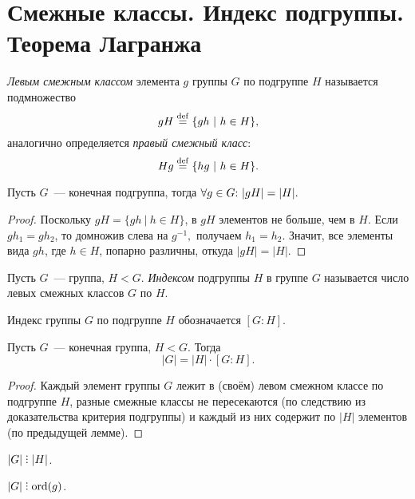\newpage
	\section{Смежные классы. Индекс подгруппы. Теорема Лагранжа}
	\setcounter{definition}{0}
	\begin{definition}
		\textit{Левым смежным классом} элемента $g$ группы $G$ по подгруппе $H$ называется подмножество
		\begin{equation*}
			gH \deq \{gh \ | \ h \in H\},
		\end{equation*}
		аналогично определяется \textit{правый смежный класс}:
		\begin{equation*}
			Hg \stackrel{\mathrm{def}}{=} \{hg \ | \ h \in H\}.
		\end{equation*}
	\end{definition}
	\begin{lemma}
		Пусть $G$~--- конечная подгруппа, тогда $\forall g \in G{:}{ } \  |gH| = |H|.$
	\end{lemma}
	\begin{proof}
		Поскольку ${gH = \{gh \ | \ h \in H\}}$, в $gH$ элементов не больше, чем в $H$. Если ${gh_1 = gh_2}$, то домножив слева на $g^{-1},$ получаем ${h_1 = h_2}$. Значит, все элементы вида $gh$, где ${h \in H}$, попарно различны, откуда ${|gH| = |H|}$.
	\end{proof}
	\begin{definition}
		Пусть $G$~--- группа, $H < G$. \textit{Индексом} подгруппы $H$ в группе $G$ называется число левых смежных классов $G$ по $H$.
	\end{definition} \n
	Индекс группы $G$ по подгруппе $H$ обозначается $[G : H]$.
	\begin{theorem*}
		Пусть $G$~--- конечная группа, $H < G$. Тогда
		\begin{equation*}
			|G| = |H| \cdot [G : H].
		\end{equation*}
	\end{theorem*}
	\begin{proof}
		Каждый элемент группы $G$ лежит в (своём) левом смежном классе по подгруппе $H$, разные смежные классы не пересекаются (по следствию из доказательства критерия подгруппы) и каждый из них содержит по $|H|$ элементов (по предыдущей лемме).
	\end{proof}
	\newpage
	\begin{consequence}
		$|G| \divby |H|$.
	\end{consequence}
	\begin{consequence}
		$|G| \divby \ord(g)$.
	\end{consequence}
